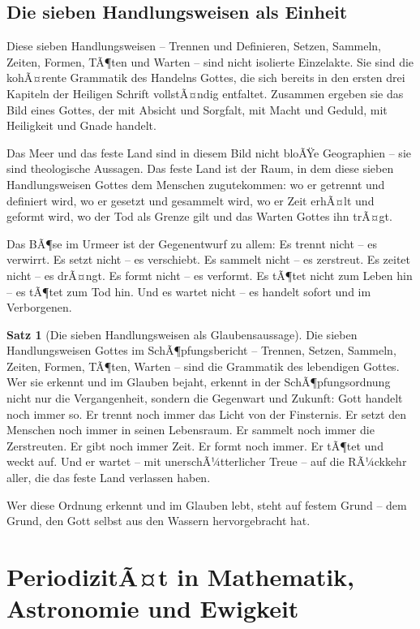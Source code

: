 ﻿\documentclass[a4paper,12pt]{article}
\theoremstyle{definition}
\newtheorem{theorem}{Satz}[section]
\begin{document}
\subsection{Die sieben Handlungsweisen als Einheit}

Diese sieben Handlungsweisen -- Trennen und Definieren, Setzen, Sammeln, Zeiten,
Formen, TÃ¶ten und Warten -- sind nicht isolierte Einzelakte. Sie sind die
kohÃ¤rente Grammatik des Handelns Gottes, die sich bereits in den ersten drei
Kapiteln der Heiligen Schrift vollstÃ¤ndig entfaltet. Zusammen ergeben sie das
Bild eines Gottes, der mit Absicht und Sorgfalt, mit Macht und Geduld, mit Heiligkeit
und Gnade handelt.

Das Meer und das feste Land sind in diesem Bild nicht bloÃŸe Geographien -- sie
sind theologische Aussagen. Das feste Land ist der Raum, in dem diese sieben
Handlungsweisen Gottes dem Menschen zugutekommen: wo er getrennt und definiert
wird, wo er gesetzt und gesammelt wird, wo er Zeit erhÃ¤lt und geformt wird, wo
der Tod als Grenze gilt und das Warten Gottes ihn trÃ¤gt.

Das BÃ¶se im Urmeer ist der Gegenentwurf zu allem: Es trennt nicht -- es verwirrt.
Es setzt nicht -- es verschiebt. Es sammelt nicht -- es zerstreut. Es zeitet nicht
-- es drÃ¤ngt. Es formt nicht -- es verformt. Es tÃ¶tet nicht zum Leben hin --
es tÃ¶tet zum Tod hin. Und es wartet nicht -- es handelt sofort und im Verborgenen.

\begin{theorem}[Die sieben Handlungsweisen als Glaubensaussage]
	Die sieben Handlungsweisen Gottes im SchÃ¶pfungsbericht -- Trennen, Setzen,
	Sammeln, Zeiten, Formen, TÃ¶ten, Warten -- sind die Grammatik des lebendigen
	Gottes. Wer sie erkennt und im Glauben bejaht, erkennt in der SchÃ¶pfungsordnung
	nicht nur die Vergangenheit, sondern die Gegenwart und Zukunft: Gott handelt
	noch immer so. Er trennt noch immer das Licht von der Finsternis. Er setzt den
	Menschen noch immer in seinen Lebensraum. Er sammelt noch immer die Zerstreuten.
	Er gibt noch immer Zeit. Er formt noch immer. Er tÃ¶tet und weckt auf. Und er
	wartet -- mit unerschÃ¼tterlicher Treue -- auf die RÃ¼ckkehr aller, die das feste
	Land verlassen haben.
\end{theorem}

Wer diese Ordnung erkennt und im Glauben lebt, steht auf festem Grund --
dem Grund, den Gott selbst aus den Wassern hervorgebracht hat.


\section{PeriodizitÃ¤t in Mathematik, Astronomie und Ewigkeit}
\end{document}
